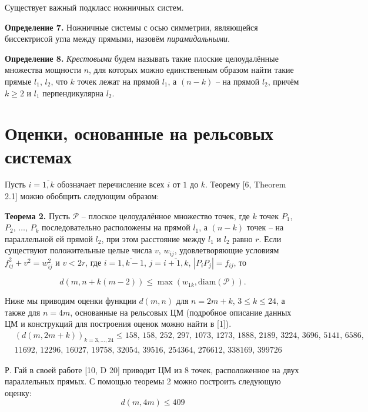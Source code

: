 \documentclass[12pt]{article}
\begin{document}
Существует важный подкласс ножничных систем.

\par
\textbf{Определение 7.}
Ножничные системы с осью симметрии,
являющейся биссектрисой угла между прямыми, назовём \textit{пирамидальными}.

\par
\textbf{Определение 8.}
\textit{Крестовыми} будем называть такие плоские целоудалённые множества мощности $n$, для которых можно единственным
образом найти такие прямые $l_1$, $l_2$, что $k$ точек лежат на прямой $l_1$, а $(n - k)$ -- на прямой $l_2$, причём $k \geq 2$ и
$l_1$ перпендикулярна $l_2$.

\section{Оценки, основанные на рельсовых системах}

Пусть $i = \overline{1, k}$ обозначает перечисление всех $i$
от $1$ до $k$.
Теорему [6, Theorem 2.1] можно обобщить
следующим образом:

\par
\textbf{Теорема 2.}
Пусть $\mathcal{P}$ -- плоское целоудалённое множество точек, где
$k$ точек $P_1$, $P_2$, $\ldots$, $P_k$ последовательно расположены на
прямой $l_1$, а $(n - k)$ точек -- на параллельной ей прямой $l_2$,
при этом расстояние между $l_1$ и $l_2$ равно $r$.
Если существуют положительные целые числа $v$, $w_{ij}$, удовлетворяющие
условиям $f_{ij}^{2} + v^{2} = w_{ij}^{2}$ и $v < 2r$, где
$i = \overline{1, k - 1}$, $j = \overline{i + 1, k}$, $|P_{i}P_{j}| = f_{ij}$,
то

\begin{equation}
d(m, n + k(m - 2)) \leq \max(w_{1k}, \operatorname{diam(\mathcal{P})})
.
\end{equation}

Ниже мы приводим оценки функции $d(m, n)$ для $n = 2m + k$, $3 \leq k \leq 24$, а также для $n = 4m$, основанные на рельсовых ЦМ (подробное описание данных ЦМ и конструкций для построения оценок можно найти в [1]).
\begin{align*}
&(d(m, 2m + k))_{k = 3, \ldots, 24} \leq 158,\, 158,\, 252,\, 297,\, 1073,\, 1273,\, 1888,\, 2189,\, 3224,\, 3696,\, 5141,\, 6586,\, \\
&11692,\, 12296,\, 16027,\, 19758,\, 32054,\, 39516,\, 254364,\, 276612,\, 338169,\, 399726
\end{align*}

Р. Гай в своей работе [10, D 20] приводит ЦМ из $8$ точек, расположенное на двух параллельных прямых. С помощью теоремы 2 можно построить следующую оценку:
\begin{equation}
d(m, 4m) \leq 409
\end{equation}
\end{document}
